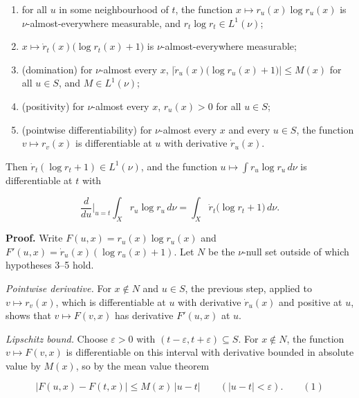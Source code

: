\documentclass[11pt,a4paper]{report}
\begin{document}
\begin{enumerate}


\item for all \(u\) in some neighbourhood of \(t\), the function \(x\mapsto r_u(x)\log r_u(x)\) is \(\nu\)-almost-everywhere measurable, and \(r_t\log r_t\in L^1(\nu)\);

\item \(x\mapsto\dot r_t(x)\bigl(\log r_t(x)+1\bigr)\) is \(\nu\)-almost-everywhere measurable;

\item (domination) for \(\nu\)-almost every \(x\), \(\bigl|\dot r_u(x)\bigl(\log r_u(x)+1\bigr)\bigr|\le M(x)\) for all \(u\in S\), and \(M\in L^1(\nu)\);

\item (positivity) for \(\nu\)-almost every \(x\), \(r_u(x)>0\) for all \(u\in S\);

\item (pointwise differentiability) for \(\nu\)-almost every \(x\) and every \(u\in S\), the function \(v\mapsto r_v(x)\) is differentiable at \(u\) with derivative \(\dot r_u(x)\).

\end{enumerate}



Then \(\dot r_t(\log r_t+1)\in L^1(\nu)\), and the function \(u\mapsto\int r_u\log r_u\,d\nu\) is differentiable at \(t\) with


\[\frac{d}{du}\Big|_{u=t}\int_Xr_u\log r_u\,d\nu=\int_X\dot r_t\bigl(\log r_t+1\bigr)\,d\nu.\]


\textbf{Proof.} Write \(F(u,x)=r_u(x)\log r_u(x)\) and \(F'(u,x)=\dot r_u(x)(\log r_u(x)+1)\). Let \(N\) be the \(\nu\)-null set outside of which hypotheses 3–5 hold.




\emph{Pointwise derivative.} For \(x\notin N\) and \(u\in S\), the previous step, applied to \(v\mapsto r_v(x)\), which is differentiable at \(u\) with derivative \(\dot r_u(x)\) and positive at \(u\), shows that \(v\mapsto F(v,x)\) has derivative \(F'(u,x)\) at \(u\).




\emph{Lipschitz bound.} Choose \(\varepsilon>0\) with \((t-\varepsilon,t+\varepsilon)\subseteq S\). For \(x\notin N\), the function \(v\mapsto F(v,x)\) is differentiable on this interval with derivative bounded in absolute value by \(M(x)\), so by the mean value theorem


\[|F(u,x)-F(t,x)|\le M(x)\,|u-t|\qquad(|u-t|<\varepsilon).\qquad(1)\]
\end{document}
